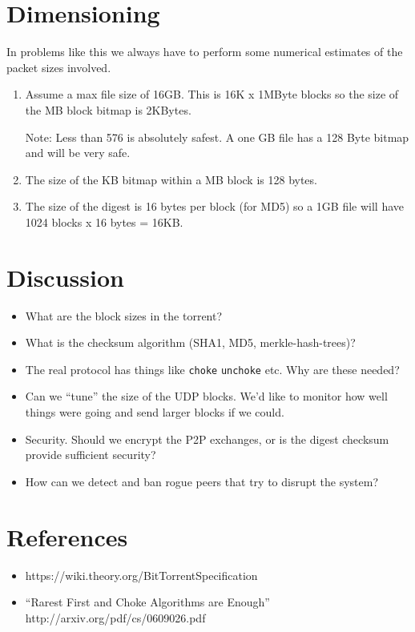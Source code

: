\documentclass[10pt]{article}
\begin{document}
\section{Dimensioning}

In problems like this we always have to perform some numerical estimates
of the packet sizes involved.

\begin{enumerate}

\item Assume a max file size of 16GB. This is 16K x 1MByte blocks
  so the size of the MB block bitmap is 2KBytes.

  Note: Less than 576 is absolutely safest.
  A one GB file has a 128 Byte bitmap and will be very safe.

\item The size of the KB bitmap within a MB block is
  128 bytes.

\item The size of the digest is 16 bytes per block (for MD5)
so a 1GB file will have 1024 blocks x 16 bytes = 16KB. 

\end{enumerate}

\section{Discussion}

\begin{itemize}

\item What are the block sizes in the torrent?
\item What is the checksum algorithm (SHA1, MD5, merkle-hash-trees)?
\item The real protocol has things like \verb+choke+ \verb+unchoke+
etc. Why are these needed?
\item Can we ``tune'' the size of the UDP blocks. We'd like to monitor
  how well things were going and send larger blocks if we could.
\item Security. Should we encrypt the P2P exchanges, or is the
digest checksum provide sufficient security?
\item How can we detect and ban rogue peers that try to disrupt the
system? 
  
\end{itemize}

\section{References}

\begin{itemize}

\item  https://wiki.theory.org/BitTorrentSpecification

\item 
  ``Rarest First and Choke Algorithms are Enough''
http://arxiv.org/pdf/cs/0609026.pdf

\end{itemize}
\end{document}
